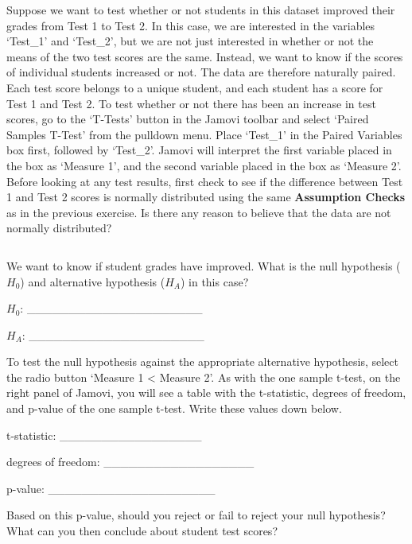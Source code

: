 \documentclass[
]{scrbook}
\begin{document}
Suppose we want to test whether or not students in this dataset improved their grades from Test 1 to Test 2.
In this case, we are interested in the variables `Test\_1' and `Test\_2', but we are not just interested in whether or not the means of the two test scores are the same.
Instead, we want to know if the scores of individual students increased or not.
The data are therefore naturally paired.
Each test score belongs to a unique student, and each student has a score for Test 1 and Test 2.
To test whether or not there has been an increase in test scores, go to the `T-Tests' button in the Jamovi toolbar and select `Paired Samples T-Test' from the pulldown menu.
Place `Test\_1' in the Paired Variables box first, followed by `Test\_2'.
Jamovi will interpret the first variable placed in the box as `Measure 1', and the second variable placed in the box as `Measure 2'.
Before looking at any test results, first check to see if the difference between Test 1 and Test 2 scores is normally distributed using the same \textbf{Assumption Checks} as in the previous exercise.
Is there any reason to believe that the data are not normally distributed?

\begin{verbatim}
\end{verbatim}

We want to know if student grades have improved.
What is the null hypothesis (\(H_{0}\)) and alternative hypothesis (\(H_{A}\)) in this case?

\(H_{0}\): \_\_\_\_\_\_\_\_\_\_\_\_\_\_\_\_\_\_\_\_\_

\(H_{A}\): \_\_\_\_\_\_\_\_\_\_\_\_\_\_\_\_\_\_\_\_\_

To test the null hypothesis against the appropriate alternative hypothesis, select the radio button `Measure 1 \textless{} Measure 2'.
As with the one sample t-test, on the right panel of Jamovi, you will see a table with the t-statistic, degrees of freedom, and p-value of the one sample t-test.
Write these values down below.

t-statistic: \_\_\_\_\_\_\_\_\_\_\_\_\_\_\_\_\_

degrees of freedom: \_\_\_\_\_\_\_\_\_\_\_\_\_\_\_\_\_\_

p-value: \_\_\_\_\_\_\_\_\_\_\_\_\_\_\_\_\_\_\_\_

Based on this p-value, should you reject or fail to reject your null hypothesis?
What can you then conclude about student test scores?

\begin{verbatim}
\end{verbatim}
\end{document}
